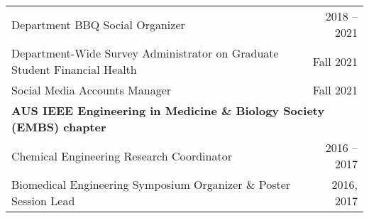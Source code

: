\documentclass[letterpaper,11pt]{article}
\begin{document}
\begin{longtable}{@{}p{}r@{}}
  \hspace{3mm} \small Department BBQ Social Organizer                                                                                                                                                                    & 2018 -- 2021                                                                \\
  \hspace{3mm} \small Department-Wide Survey Administrator on Graduate Student Financial Health                                                                                                                          & Fall 2021                                                                   \\
  \hspace{3mm} \small Social Media Accounts Manager                                                                                                                                                                      & Fall 2021                                                                   \\ [4pt]
  \multicolumn{2}{l}{\hspace{-3mm} \bf{AUS IEEE Engineering in Medicine \& Biology Society (EMBS) chapter}}                                                                                                                                                                                            \\
  \hspace{3mm} \small Chemical Engineering Research Coordinator                                                                                                                                                          & 2016 -- 2017                                                                \\
  \hspace{3mm} \small Biomedical Engineering Symposium Organizer \& Poster Session Lead                                                                                                                                  & 2016, 2017                                                                  \\
\end{longtable}

\end{document}

